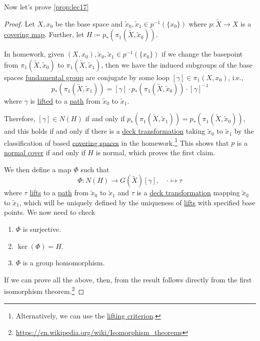 Now let's prove \autoref{prop:lec17}
\begin{proof}
	Let \(X, x_0\) be the base space and \(\widetilde{x} _0, \widetilde{x} _1\in p^{-1} (\{x_0\})\) where \(p\colon \widetilde{X} \to X\) is a
	\hyperref[def:covering-map]{covering map}. Further, let \(H\coloneqq p_\ast(\pi _1(\widetilde{X} , \widetilde{x} _0))\).

	In homework, given \((X, x_0), \widetilde{x} _0, \widetilde{x} _1\in p^{-1} (\{x_0\})\) if we change the basepoint from \(\pi _1(\widetilde{X} , \widetilde{x} _0)\)
	to \(\pi _1(\widetilde{X} , \widetilde{x} _1)\), then we have the induced subgroups of the base spaces \hyperref[def:fundamental-group]{fundamental group}
	are conjugate by some loop \([\gamma ]\in \pi _1(X, x_0)\), i.e.,
	\[
		p_\ast (\pi _1(\widetilde{X} , \widetilde{x} _1)) = [\gamma ]\cdot p_\ast (\pi _1(\widetilde{X} , \widetilde{x} _0))\cdot [\gamma ]^{-1}
	\]
	where \(\gamma\) is \hyperref[prop:homotopy-lifting-property]{lifted} to a \hyperref[def:path]{path} from \(\widetilde{x} _0\) to \(\widetilde{x} _1\).

	\par Therefore, \([\gamma ]\in N(H)\) if and only if \(p_\ast(\pi _1(\widetilde{X} , \widetilde{x} _1)) = p_\ast(\pi _1(\widetilde{X} , \widetilde{x} _0))\),
	and this holds if and only if there is a \hyperref[def:deck-transformation]{deck transformation} taking \(\widetilde{x} _0\) to \(\widetilde{x} _1\)
	by the classification of based \hyperref[def:covering-space]{covering spaces} in the homework.\footnote{Alternatively, we can use the \hyperref[prop:lifting-criterion]{lifting criterion}.}
	This shows that \(p\) is a \hyperref[def:normal]{normal cover} if and only if \(H\) is normal, which proves the first claim.

	\par We then define a map \(\Phi \) such that
	\[
		\Phi \colon N(H)\to G(\widetilde{X} )[\gamma ],\quad \cdot \mapsto \tau
	\]
	where \(\tau \) \hyperref[prop:homotopy-lifting-property]{lifts} to a \hyperref[def:path]{path} from \(\widetilde{x} _0\) to \(\widetilde{x} _1\) and
	\(\tau \) is a \hyperref[def:deck-transformation]{deck transformation} mapping \(\widetilde{x} _0\) to \(\widetilde{x} _1\), which will be
	uniquely defined by the uniqueness of \hyperref[prop:homotopy-lifting-property]{lifts} with specified base points. We now need to check
	\begin{enumerate}
		\item \(\Phi \) is surjective.
		\item \(\ker  (\Phi )= H\).
		\item \(\Phi \) is a group homomorphism.
	\end{enumerate}
	If we can prove all the above, then, from the result follows directly from the first isomorphism theorem.\footnote{\url{https://en.wikipedia.org/wiki/Isomorphism_theorems}}


\end{proof}
